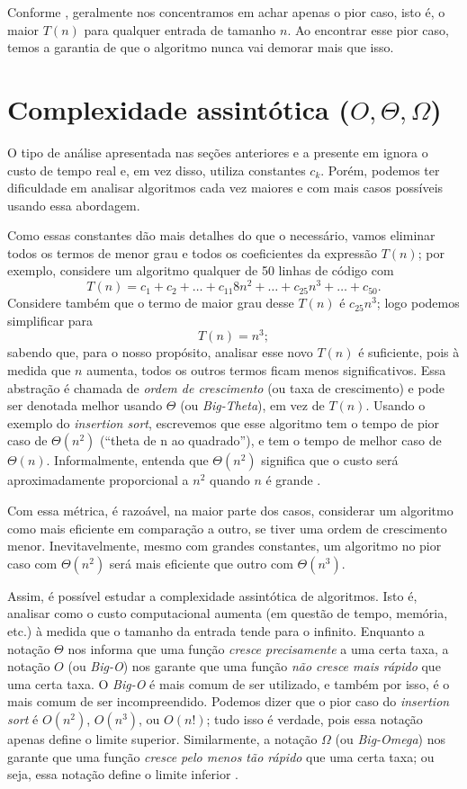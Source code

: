 \documentclass[12pt,a4paper]{article}
\begin{document}
Conforme \textcite[31]{clrs2022}, geralmente nos concentramos em achar apenas o pior caso, isto é,
o maior $T(n)$ para qualquer entrada de tamanho $n$.
Ao encontrar esse pior caso, temos a garantia de que o algoritmo nunca vai demorar mais que isso.

\section{Complexidade assintótica (\texorpdfstring{$O, \Theta, \Omega$}{O, Theta, Omega})}\label{sec:assintotica}
O tipo de análise apresentada nas seções anteriores e a presente em \textcite[seç.~2.2]{clrs2022}
ignora o custo de tempo real e, em vez disso, utiliza constantes $c_k$.
Porém, podemos ter dificuldade em analisar algoritmos cada vez maiores e com mais casos possíveis usando essa abordagem.

Como essas constantes dão mais detalhes do que o necessário, vamos eliminar todos os termos de menor grau
e todos os coeficientes da expressão $T(n)$; por exemplo, considere um algoritmo qualquer de 50 linhas de código com
\[
    T(n) = c_1 + c_2 + \dots + c_{11}8n^2 + \dots + c_{25}n^3 + \dots + c_{50}.
\]
Considere também que o termo de maior grau desse $T(n)$ é $c_{25}n^3$; logo podemos simplificar para
\[
    T(n) = n^3;
\]
sabendo que, para o nosso propósito, analisar esse novo $T(n)$ é suficiente, pois à medida que $n$ aumenta,
todos os outros termos ficam menos significativos.
Essa abstração é chamada de \emph{ordem de crescimento} (ou taxa de crescimento)
e pode ser denotada melhor usando $\Theta$ (ou \textit{Big-Theta}),
em vez de $T(n)$.
Usando o exemplo do \textit{insertion sort},
escrevemos que esse algoritmo tem o tempo de pior caso de $\Theta(n^2)$ (``theta de n ao quadrado''),
e tem o tempo de melhor caso de $\Theta(n)$.
Informalmente, entenda que $\Theta(n^2)$ significa que o custo será aproximadamente proporcional a $n^2$ quando $n$ é grande
\parencite[32--33]{clrs2022}.

Com essa métrica, é razoável, na maior parte dos casos,
considerar um algoritmo como mais eficiente em comparação a outro, se tiver uma ordem de crescimento menor.
Inevitavelmente, mesmo com grandes constantes, um algoritmo no pior caso com $\Theta(n^2)$ será mais eficiente que outro com $\Theta(n^3)$.

Assim, é possível estudar a complexidade assintótica de algoritmos.
Isto é, analisar como o custo computacional aumenta (em questão de tempo, memória, etc.) à medida que o tamanho da entrada tende para o infinito.
Enquanto a notação $\Theta$ nos informa que uma função \emph{cresce precisamente} a uma certa taxa,
a notação $O$ (ou \textit{Big-O}) nos garante que uma função \emph{não cresce mais rápido} que uma certa taxa.
O \textit{Big-O} é mais comum de ser utilizado, e também por isso, é o mais comum de ser incompreendido.
Podemos dizer que o pior caso do \textit{insertion sort} é $O(n^2)$, $O(n^3)$, ou $O(n!)$; tudo isso é verdade,
pois essa notação apenas define o limite superior.
Similarmente, a notação $\Omega$ (ou \textit{Big-Omega}) nos garante que uma função \emph{cresce pelo menos tão rápido} que uma certa taxa;
ou seja, essa notação define o limite inferior \parencite[49--51,56--57]{clrs2022}.
\end{document}
